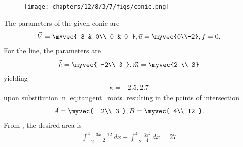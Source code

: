 	\begin{figure}[H]
		\centering
 \texttt{[image: chapters/12/8/3/7/figs/conic.png]}
		\caption{}
		\label{fig:12/8/3/7}
  	\end{figure}
The parameters of the given conic are
\begin{align}
\vec{V}=\myvec{
3 & 0\\
0 & 0
},
\vec{u}=\myvec{0\\-2},
f=0.
\end{align} 
For the line, the parameters are
\begin{align}
\vec{h} = \myvec{
-2\\
3
},
\vec{m} = \myvec{2 \\ 3}
\end{align}
yielding
\begin{align}
    \kappa=-2.5,2.7
\end{align}
upon substitution in \eqref{eq:tangent_roots}
resulting in the points of intersection
\begin{align}
    \vec{A}=\myvec{
-2\\
3
    },
    \vec{B}=\myvec{
4\\
12
    }.
\end{align}
From 
		,
the desired area is 
\begin{align}
\int_{-2}^{4} \frac{3x+12}{2} \,dx
-\int_{-2}^{4}\frac{3x^2}{4} \,dx 
= 27 
\end{align}
